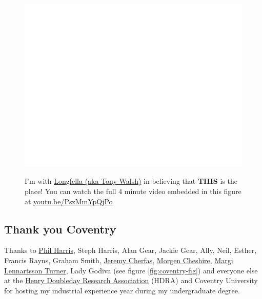 \documentclass[
]{book}
\begin{document}
\begin{figure}

{\centering \href{https://www.youtube.com/embed/PszMmYpQjPo}{\includegraphics[width=0.99\linewidth]{cdyf_files/figure-latex/this-is-the-place-fig-1} }

}

\caption{I'm with \href{https://en.wikipedia.org/wiki/Tony_Walsh_(poet)}{Longfella (aka Tony Walsh)} in believing that \textbf{THIS} is the place! You can watch the full 4 minute video embedded in this figure at \href{https://youtu.be/PszMmYpQjPo}{youtu.be/PszMmYpQjPo} \citep{longfella} 🙏}\label{fig:this-is-the-place-fig}
\end{figure}



\hypertarget{coventry}{%
\subsection{Thank you Coventry}\label{coventry}}

Thanks to \href{https://www.coventry.ac.uk/research/research-people/professor-phil-harris/}{Phil Harris}, Steph Harris, Alan Gear, Jackie Gear, Ally, Neil, Esther, Francis Rayns, Graham Smith, \href{https://www.jeremycherfas.net/}{Jeremy Cherfas}, \href{https://cheshirenonprofitlaw.com/people/team/morgen/}{Morgen Cheshire}, \href{https://pureportal.coventry.ac.uk/en/persons/margi-lennartsson-turner}{Margi Lennartsson Turner}, Lady Godiva (see figure \ref{fig:coventry-fig}) and everyone else at the \href{https://en.wikipedia.org/wiki/Henry_Doubleday_Research_Association}{Henry Doubleday Research Association} (HDRA) and Coventry University for hosting my industrial experience year during my undergraduate degree.
\end{document}
